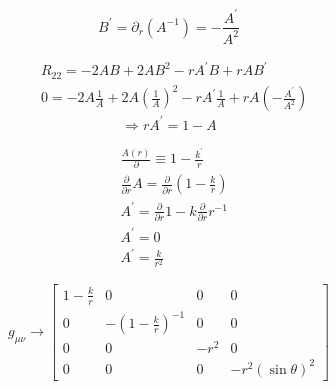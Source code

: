 \begin{equation}
    B^{\prime}=\partial_r\left(A^{-1}\right)=-\frac{A^{\prime}}{A^2}
\end{equation}


\begin{equation}
    \begin{aligned}
         & R_{22}=-2 A B+2 A B^2-r A^{\prime} B+r A B^{\prime}                                                               \\
         & 0=-2 A \frac{1}{A}+2 A\left(\frac{1}{A}\right)^2-r A^{\prime} \frac{1}{A}+r A\left(-\frac{A^{\prime}}{A^2}\right)
    \end{aligned}
\end{equation}
\begin{equation}
    \Rightarrow r A^{\prime}=1-A
\end{equation}

\begin{equation}
    \begin{aligned}
         & \frac{A(r)}{\partial} \equiv 1-\frac{k^{\prime}}{r}                                 \\
         & \frac{\partial}{\partial r} A=\frac{\partial}{\partial r}\left(1-\frac{k}{r}\right) \\
         & A^{\prime}=\frac{\partial}{\partial r} 1-k \frac{\partial}{\partial r} r^{-1}       \\
         & A^{\prime}=0                                                                        \\
         & A^{\prime}=\frac{k}{r^2}
    \end{aligned}
\end{equation}

\begin{equation}
    g_{\mu \nu} \rightarrow\left[\begin{array}{cccc}
            1-\frac{k}{r} & 0                                & 0    & 0                   \\
            0             & -\left(1-\frac{k}{r}\right)^{-1} & 0    & 0                   \\
            0             & 0                                & -r^2 & 0                   \\
            0             & 0                                & 0    & -r^2(\sin \theta)^2
        \end{array}\right]
\end{equation}

